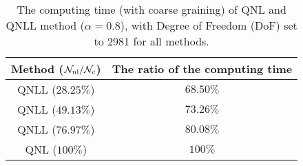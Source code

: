 \begin{table}[h]
	\centering
	\renewcommand{\arraystretch}{1.5} %
	\begin{tabular}{|c|c|} %
		\hline %
		Method ($\mathcal{N}_{{\rm nl}}/\mathcal{N}_{{\rm c}}$) & The ratio of the computing time\\ %
		\hline %
		QNLL ($28.25\%$) & $68.50\%$ \\ %
		QNLL ($49.13\%$) & $73.26\%$ \\ %
		QNLL ($76.97\%$) & $80.08\%$ \\ %
		QNL ($100\%$) & $100\%$ \\ %
		\hline %
	\end{tabular}
	\caption{The computing time (with coarse graining) of QNL and QNLL method ($\alpha = 0.8$), with Degree of Freedom (DoF) set to 2981 for all methods.}
	\label{tab:computing time alpha08 CG}
\end{table}


